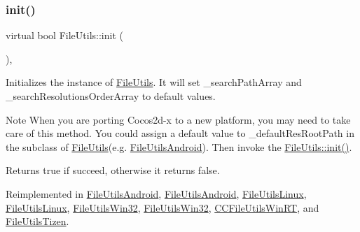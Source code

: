 \subsubsection{\texorpdfstring{init()}{init()}\hspace{0.1cm}{\footnotesize\ttfamily [2/2]}}
{\footnotesize\ttfamily virtual bool File\+Utils\+::init (\begin{DoxyParamCaption}{ }\end{DoxyParamCaption})\hspace{0.3cm}{\ttfamily [protected]}, {\ttfamily [virtual]}}

Initializes the instance of \hyperlink{classFileUtils}{File\+Utils}. It will set \+\_\+search\+Path\+Array and \+\_\+search\+Resolutions\+Order\+Array to default values.

\begin{DoxyNote}{Note}
When you are porting Cocos2d-\/x to a new platform, you may need to take care of this method. You could assign a default value to \+\_\+default\+Res\+Root\+Path in the subclass of \hyperlink{classFileUtils}{File\+Utils}(e.\+g. \hyperlink{classFileUtilsAndroid}{File\+Utils\+Android}). Then invoke the \hyperlink{classFileUtils_a2c891e99dc7af7343f4f9e8d4798a563}{File\+Utils\+::init()}. 
\end{DoxyNote}
\begin{DoxyReturn}{Returns}
true if succeed, otherwise it returns false. 
\end{DoxyReturn}


Reimplemented in \hyperlink{classFileUtilsAndroid_a5ff9d802609690baa039ebef0508b2c6}{File\+Utils\+Android}, \hyperlink{classFileUtilsAndroid_a5ff9d802609690baa039ebef0508b2c6}{File\+Utils\+Android}, \hyperlink{classFileUtilsLinux_a6de155528c1b10597d623f784b72762c}{File\+Utils\+Linux}, \hyperlink{classFileUtilsLinux_a1f11f2fb2b248fe6670cf991251d2821}{File\+Utils\+Linux}, \hyperlink{classFileUtilsWin32_a686cc28ad94c2c904c857cb2808b36d4}{File\+Utils\+Win32}, \hyperlink{classFileUtilsWin32_a686cc28ad94c2c904c857cb2808b36d4}{File\+Utils\+Win32}, \hyperlink{classCCFileUtilsWinRT_a1f2d5c30d599ab4490a2dead634f7459}{C\+C\+File\+Utils\+Win\+RT}, and \hyperlink{classFileUtilsTizen_a3c094c5c41c9f01e31158e1c81690419}{File\+Utils\+Tizen}.

\mbox{\label{classFileUtils_aed08c5ac2854f3fb5c104386ab96a90c}} 

